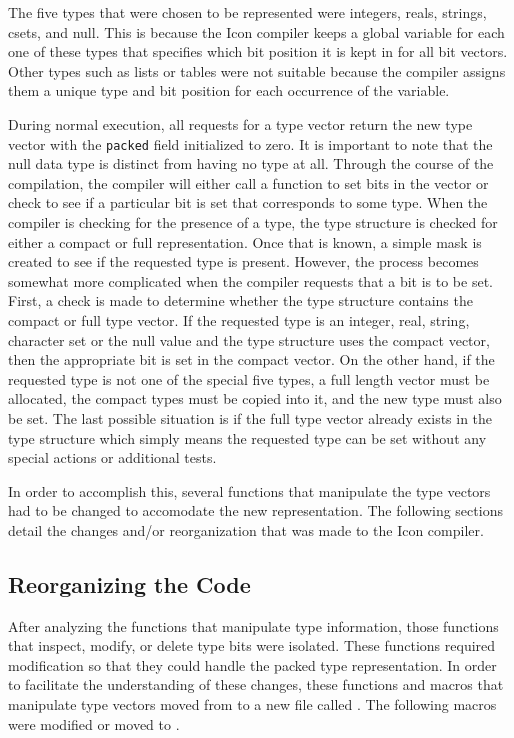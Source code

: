 The five types that were chosen to be represented were integers,
reals, strings, csets, and null. This is because the Icon compiler
keeps a global variable for each one of these types that specifies
which bit position it is kept in for all bit vectors. Other types such
as lists or tables were not suitable because the compiler assigns them
a unique type and bit position for each occurrence of the variable.

During normal execution, all requests for a type vector return the new
type vector with the \texttt{packed} field initialized to zero. It
is important to note that the null data type is distinct from having
no type at all. Through the course of the compilation, the compiler
will either call a function to set bits in the vector or check to see
if a particular bit is set that corresponds to some type. When the
compiler is checking for the presence of a type, the type structure is
checked for either a compact or full representation. Once that is
known, a simple mask is created to see if the requested type is
present. However, the process becomes somewhat more complicated when
the compiler requests that a bit is to be set. First, a check is
made to determine whether the type structure contains the compact or
full type vector. If the requested type is an integer, real, string,
character set or the null value and the type structure uses the
compact vector, then the appropriate bit is set in the compact
vector. On the other hand, if the requested type is not one of the
special five types, a full length vector must be allocated, the
compact types must be copied into it, and the new type must also be
set. The last possible situation is if the full type vector already
exists in the type structure which simply means the requested type can
be set without any special actions or additional tests.

In order to accomplish this, several functions that manipulate the
type vectors had to be changed to accomodate the new representation.
The following sections detail the changes and/or reorganization that
was made to the Icon compiler.

\subsection{Reorganizing the Code}

After analyzing the functions that manipulate type information, those
functions that inspect, modify, or delete type bits were
isolated. These functions required modification so that they could
handle the packed type representation. In order to facilitate the
understanding of these changes, these functions and macros that
manipulate type vectors moved from  to a new file
called . The following macros were modified or moved
to .


